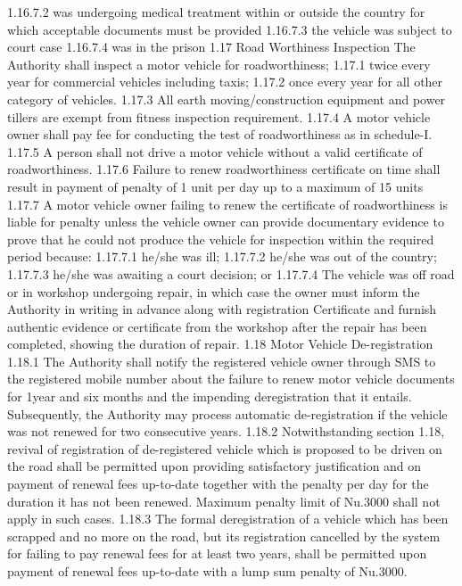 \documentclass[
]{book}
\begin{document}
1.16.7.2 was undergoing medical treatment within or outside the country for which acceptable documents must be provided
1.16.7.3 the vehicle was subject to court case
1.16.7.4 was in the prison
1.17 Road Worthiness Inspection
The Authority shall inspect a motor vehicle for roadworthiness;
1.17.1 twice every year for commercial vehicles including taxis;
1.17.2 once every year for all other category of vehicles.
1.17.3 All earth moving/construction equipment and power tillers are exempt from fitness inspection requirement.
1.17.4 A motor vehicle owner shall pay fee for conducting the test of roadworthiness as in schedule-I.
1.17.5 A person shall not drive a motor vehicle without a valid certificate of roadworthiness.
1.17.6 Failure to renew roadworthiness certificate on time shall result in payment of penalty of 1 unit per day up to a maximum of 15 units
1.17.7 A motor vehicle owner failing to renew the certificate of roadworthiness is liable for penalty unless the vehicle owner can provide documentary evidence to prove that he could not produce the vehicle for inspection within the required period because:
1.17.7.1 he/she was ill;
1.17.7.2 he/she was out of the country;
1.17.7.3 he/she was awaiting a court decision; or
1.17.7.4 The vehicle was off road or in workshop undergoing repair, in which case the owner must inform the Authority in writing in advance along with registration Certificate and furnish authentic evidence or certificate from the workshop after the repair has been completed, showing the duration of repair.
1.18 Motor Vehicle De-registration
1.18.1 The Authority shall notify the registered vehicle owner through SMS to the registered mobile number about the failure to renew motor vehicle documents for 1year and six months and the impending deregistration that it entails. Subsequently, the Authority may process automatic de-registration if the vehicle was not renewed for two consecutive years.
1.18.2 Notwithstanding section 1.18, revival of registration of de-registered vehicle which is proposed to be driven on the road shall be permitted upon providing satisfactory justification and on payment of renewal fees up-to-date together with the penalty \citet{Nu.10} per day for the duration it has not been renewed. Maximum penalty limit of Nu.3000 shall not apply in such cases.
1.18.3 The formal deregistration of a vehicle which has been scrapped and no more on the road, but its registration cancelled by the system for failing to pay renewal fees for at least two years, shall be permitted upon payment of renewal fees up-to-date with a lump sum penalty of Nu.3000.
\end{document}
